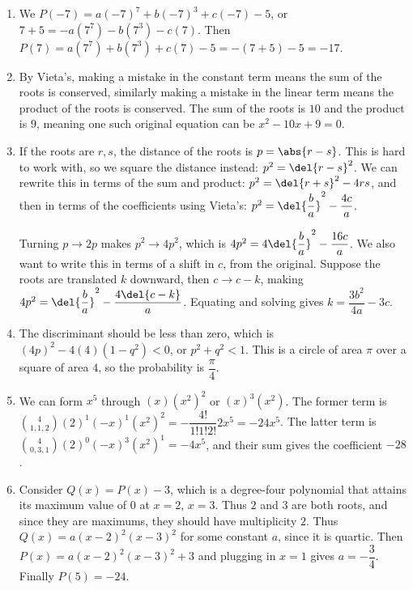 \documentclass[10pt,paper=letter]{scrartcl}
\begin{document}
\begin{enumerate}

\item We $P(-7) = a(-7)^7 + b(-7)^3 + c(-7) - 5$, or $7 + 5 = -a(7^7) - b(7^3) - c(7)$. Then $P(7) = a(7^7) + b(7^3) + c(7) - 5 = -(7 + 5) - 5 = -17$.

\item By Vieta's, making a mistake in the constant term means the sum of the roots is conserved, similarly making a mistake in the linear term means the product of the roots is conserved. The sum of the roots is $10$ and the product is $9$, meaning one such original equation can be $x^2 - 10x + 9 = 0$.

\item If the roots are $r, s$, the distance of the roots is $p = \abs{r - s}$. This is hard to work with, so we square the distance instead: $p^2 = \del{r - s}^2$. We can rewrite this in terms of the sum and product: $p^2 = \del{r + s}^2 - 4rs$, and then in terms of the coefficients using Vieta's: $p^2 = \del{\dfrac ba}^2 - \dfrac{4c}a$.

Turning $p \to 2p$ makes $p^2 \to 4p^2$, which is $4p^2 = 4\del{\dfrac ba}^2 - \dfrac{16c}a$. We also want to write this in terms of a shift in $c$, from the original. Suppose the roots are translated $k$ downward, then $c \to c - k$, making $4p^2 = \del{\dfrac ba}^2 - \dfrac{4\del{c-k}}a$. Equating and solving gives $k = \dfrac{3b^2}{4a} - 3c$.

\item The discriminant should be less than zero, which is $(4p)^2 - 4(4)(1 - q^2) < 0$, or $p^2 + q^2 < 1$. This is a circle of area $\pi$ over a square of area $4$, so the probability is $\dfrac\pi4$.

\item We can form $x^5$ through $(x)(x^2)^2$ or $(x)^3(x^2)$. The former term is $\binom{4}{1,1,2} (2)^1(-x)^1(x^2)^2 = -\dfrac{4!}{1!1!2!} 2x^5 = -24x^5$. The latter term is $\binom{4}{0,3,1} (2)^0(-x)^3(x^2)^1 = -4x^5$, and their sum gives the coefficient $-28$.

\item Consider $Q(x) = P(x) - 3$, which is a degree-four polynomial that attains its maximum value of $0$ at $x = 2$, $x = 3$. Thus $2$ and $3$ are both roots, and since they are maximums, they should have multiplicity 2. Thus $Q(x) = a(x-2)^2(x-3)^2$ for some constant $a$, since it is quartic. Then $P(x) = a(x-2)^2(x-3)^2 + 3$ and plugging in $x = 1$ gives $a = -\dfrac34$. Finally $P(5) = -24$.


\end{enumerate}
\end{document}
